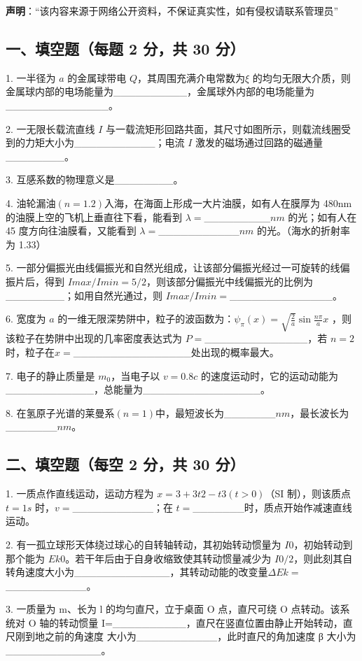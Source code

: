
\textbf{声明}：“该内容来源于网络公开资料，不保证真实性，如有侵权请联系管理员”

\subsection{一、填空题（每题 2 分，共 30 分）}
1. 一半径为 $a$ 的金属球带电 $Q$，其周围充满介电常数为$\xi$ 的均匀无限大介质，则金属球内部的电场能量为__________，金属球外内部的电场能量为______________。

2. 一无限长载流直线 $I$ 与一载流矩形回路共面，其尺寸如图所示，则载流线圈受到的力矩大小为___________；电流 $I$ 激发的磁场通过回路的磁通量________。

3. 互感系数的物理意义是________。

4. 油轮漏油$(n=1.2)$入海，在海面上形成一大片油膜，如有人在膜厚为 480nm的油膜上空的飞机上垂直往下看，能看到 $\lambda=$_________$nm$ 的光；如有人在 45 度方向往油膜看，又能看到 $\lambda=$___________$nm$ 的光。（海水的折射率为 1.33）

5. 一部分偏振光由线偏振光和自然光组成，让该部分偏振光经过一可旋转的线偏振片后，得到 $Imax/Imin=5/2$，则该部分偏振光中线偏振光的比例为________；如用自然光通过，则 $Imax/Imin=$______________。

6. 宽度为 $a$ 的一维无限深势阱中，粒子的波函数为：$\psi_\pi(x)=\sqrt{\frac{2}{a}}\sin\frac{n \pi}{a}x$ ，则该粒子在势阱中出现的几率密度表达式为 $P=$______________，若 $n=2$ 时，粒子在$x=$________________处出现的概率最大。

7. 电子的静止质量是 $m_0$，当电子以 $v=0.8c$ 的速度运动时，它的运动动能为____________，总能量为________________。

8. 在氢原子光谱的莱曼系$(n=1)$中，最短波长为_______$nm$，最长波长为_______$nm$。
\subsection{二、填空题（每空 2 分，共 30 分）}
1. 一质点作直线运动，运动方程为 $x=3+3t2-t3(t>0)$（SI 制），则该质点 $t=1s$
时，$v=$___________；在 $t=$_______时，质点开始作减速直线运动。

2. 有一孤立球形天体绕过球心的自转轴转动，其初始转动惯量为 $I0$，初始转动到那个能为 $Ek0$。若干年后由于自身收缩致使其转动惯量减少为 $I0/2$，则此刻其自转角速度大小为_____________，其转动动能的改变量$\Delta Ek=$___________。

3. 一质量为 m、长为 l 的均匀直尺，立于桌面 O 点，直尺可绕 O 点转动。该系统对 O 轴的转动惯量 I=__________，直尺在竖直位置由静止开始转动，直尺刚到地之前的角速度 大小为___________，此时直尺的角加速度 β 大小为_____________。

